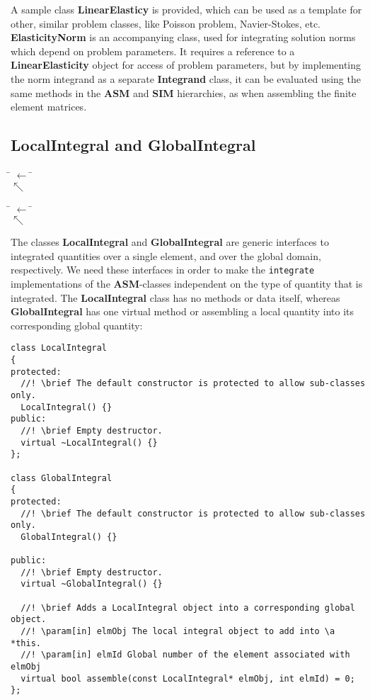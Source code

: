 \documentclass{article}
\begin{document}
A sample class {\bf LinearElasticy} is provided, which can be used as a template
for other, similar problem classes, like Poisson problem, Navier-Stokes, etc.
{\bf ElasticityNorm} is an accompanying class, used for integrating solution norms
which depend on problem parameters.
It requires a reference to a {\bf LinearElasticity} object for access of problem
parameters, but by implementing the norm integrand as a separate {\bf Integrand}
class, it can be evaluated using the same methods in the {\bf ASM} and {\bf SIM}
hierarchies, as when assembling the finite element matrices.

\clearpage
\subsection{LocalIntegral and GlobalIntegral}
\begin{center}
\begin{minipage}{7cm}
\begin{tabbing}
 \= $\leftarrow$ \=
 \+ \\ $\nwarrow$ \+ \\
\end{tabbing}
\end{minipage}
\hskip1cm
\begin{minipage}{7cm}
\begin{tabbing}
 \= $\leftarrow$ \=
 \+ \\ $\nwarrow$ \+ \\
\end{tabbing}
\end{minipage}
\end{center}

The classes {\bf LocalIntegral} and {\bf GlobalIntegral} are generic interfaces
to integrated quantities over a single element, and over the global domain,
respectively.
We need these interfaces in order to make the {\tt integrate} implementations
of the {\bf ASM}-classes independent on the type of quantity that is integrated.
The {\bf LocalIntegral} class has no methods or data itself, whereas
{\bf GlobalIntegral} has one virtual method or assembling a local quantity into
its corresponding global quantity:

{\small\begin{verbatim}
class LocalIntegral
{
protected:
  //! \brief The default constructor is protected to allow sub-classes only.
  LocalIntegral() {}
public:
  //! \brief Empty destructor.
  virtual ~LocalIntegral() {}
};

class GlobalIntegral
{
protected:
  //! \brief The default constructor is protected to allow sub-classes only.
  GlobalIntegral() {}

public:
  //! \brief Empty destructor.
  virtual ~GlobalIntegral() {}

  //! \brief Adds a LocalIntegral object into a corresponding global object.
  //! \param[in] elmObj The local integral object to add into \a *this.
  //! \param[in] elmId Global number of the element associated with elmObj
  virtual bool assemble(const LocalIntegral* elmObj, int elmId) = 0;
};
\end{verbatim}}
\end{document}
